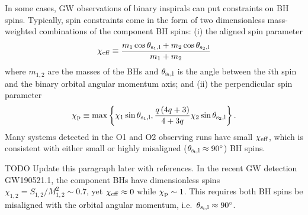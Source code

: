 \documentclass[
        twocolumn,
        twocolappendix
    ]{aastex63}
\newcommand*{\p}[1]{\left(#1\right)}
\newcommand*{\z}[1]{\left\{#1\right\}}
\begin{document}
In some cases, GW observations of binary inspirals can put constraints on BH
spins. Typically, spin constraints come in the form of two dimensionless
mass-weighted combinations of the component BH spins: (i) the aligned spin
parameter
\begin{equation}
    \chi_{\rm eff} \equiv \frac{m_1\cos \theta_{\rm s_1, l}
            + m_2\cos \theta_{\rm s_2, l}}{m_1 + m_2}
\end{equation}
where $m_{1,2}$ are the masses of the BHs and $\theta_{\rm s_i, l}$ is the angle
between the $i$th spin and the binary orbital angular momentum axis; and (ii)
the perpendicular spin parameter \citep{schmidt2015towards}
\begin{equation}
    \chi_{\rm p} \equiv \max\z{
        \chi_1 \sin \theta_{\rm s_1,l}, \frac{q\p{4q + 3}}{4 + 3q} \chi_2 \sin
        \theta_{\rm s_2,l}}.
\end{equation}
Many systems detected in the O1 and O2 observing runs have small $\chi_{\rm
eff}$, which is consistent with either small or highly misaligned ($\theta_{\rm
s_i, l} \approx 90^\circ$) BH spins.

\textcolor{Corr}{TODO Update this paragraph later with references.} In the
recent GW detection GW190521.1, the component BHs have dimensionless spins
$\chi_{1, 2} = S_{1,2} / M_{1, 2}^2 \sim 0.7$, yet $\chi_{\rm eff} \approx 0$
while $\chi_{\rm p} \sim 1$. This requires both BH spins be misaligned with the
orbital angular momentum, i.e.\ $\theta_{\rm s_i, l} \approx 90^\circ$.
\end{document}

